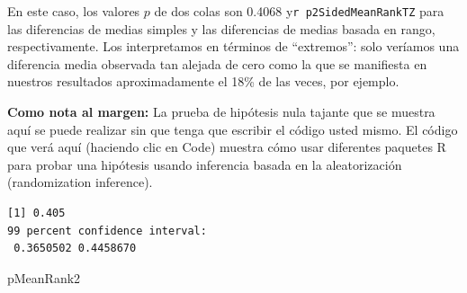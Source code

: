 \documentclass[
]{article}
\newenvironment{Shaded}{\begin{snugshade}}{\end{snugshade}}
\newcommand{\AttributeTok}[1]{\textcolor[rgb]{0.77,0.63,0.00}{#1}}
\newcommand{\DecValTok}[1]{\textcolor[rgb]{0.00,0.00,0.81}{#1}}
\newcommand{\DocumentationTok}[1]{\textcolor[rgb]{0.56,0.35,0.01}{\textbf{\textit{#1}}}}
\newcommand{\FunctionTok}[1]{\textcolor[rgb]{0.00,0.00,0.00}{#1}}
\newcommand{\NormalTok}[1]{#1}
\newcommand{\OtherTok}[1]{\textcolor[rgb]{0.56,0.35,0.01}{#1}}
\newcommand{\SpecialCharTok}[1]{\textcolor[rgb]{0.00,0.00,0.00}{#1}}
\begin{document}
En este caso, los valores \(p\) de dos colas son 0.4068 y\texttt{r\ p2SidedMeanRankTZ} para las diferencias de medias simples y las diferencias de medias basada en rango, respectivamente. Los interpretamos en términos de ``extremos'': solo veríamos una diferencia media observada tan alejada de cero como la que se manifiesta en nuestros resultados aproximadamente el 18\% de las veces, por ejemplo.

\textbf{Como nota al margen:} La prueba de hipótesis nula tajante que se muestra aquí se puede realizar sin que tenga que escribir el código usted mismo. El código que verá aquí (haciendo clic en Code) muestra cómo usar diferentes paquetes R para probar una hipótesis usando inferencia basada en la aleatorización (randomization inference).

\begin{Shaded}
\end{Shaded}

\begin{verbatim}
[1] 0.405
99 percent confidence interval:
 0.3650502 0.4458670 
\end{verbatim}

\begin{Shaded}
\begin{Highlighting}[]
\NormalTok{pMeanRank2}
\end{Highlighting}
\end{Shaded}
\end{document}
